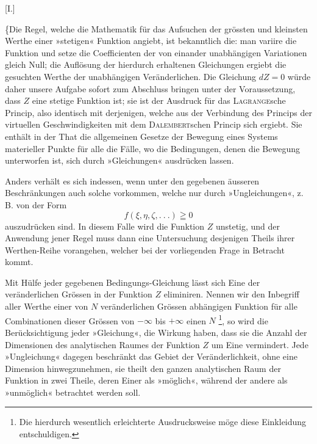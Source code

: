 \clearpage{}\NoSourceHead
{}
\begin{center}[I.]\end{center}
\indent \{Die Regel, welche die Mathematik für das Aufsuchen der grössten und kleinsten Werthe einer »stetigen« Funktion angiebt, ist bekanntlich die: man variire die Funktion und setze die Coefficienten der von einander unabhängigen Variationen gleich Null; die Auflösung der hierdurch erhaltenen Gleichungen ergiebt die gesuchten Werthe der unabhängigen Veränderlichen. Die Gleichung \(dZ=0\) würde daher unsere Aufgabe sofort zum Abschluss bringen unter der Voraussetzung, dass \(Z\) eine stetige Funktion ist; sie ist der Ausdruck für das \textsc{Lagrange}sche Princip, also identisch mit derjenigen, welche aus der Verbindung des Princips der virtuellen Geschwindigkeiten mit dem \textsc{Dalembert}schen Princip sich ergiebt. Sie enthält in der That die allgemeinen Gesetze der Bewegung eines Systems materieller Punkte für alle die Fälle, wo die Bedingungen, denen die Bewegung unterworfen ist, sich durch »Gleichungen« ausdrücken lassen.

\indent Anders verhält es sich indessen, wenn unter den gegebenen äusseren Beschränkungen auch solche vorkommen, welche nur durch »Ungleichungen«, z. B. von der Form
\[
f(\xi,\eta,\zeta,.\ .\ .)\geqq 0
\]
\noindent auszudrücken sind. In diesem Falle wird die Funktion \(Z\) unstetig, und der Anwendung jener Regel muss dann eine Untersuchung desjenigen Theils ihrer
\clearpage{}
\noindent Werthen-Reihe vorangehen, welcher bei der vorliegenden Frage in Betracht kommt.

\indent Mit Hülfe jeder gegebenen Bedingungs-Gleichung lässt sich Eine der veränderlichen Grössen in der Funktion \(Z\) eliminiren. Nennen wir den Inbegriff aller Werthe einer von \(N\) veränderlichen Grössen abhängigen Funktion für alle Combinationen dieser Grössen von \(-\infty\) bis \(+\infty\) einen  \(N\) \footnote{Die hierdurch wesentlich erleichterte Ausdrucksweise möge diese Einkleidung entschuldigen.}, so wird die Berücksichtigung jeder »Gleichung«, die Wirkung haben, dass sie die Anzahl der Dimensionen des analytischen Raumes der Funktion \(Z\) um Eine vermindert. Jede »Ungleichung« dagegen beschränkt das Gebiet der Veränderlichkeit, ohne eine Dimension hinwegzunehmen, sie theilt den ganzen analytischen Raum der Funktion in zwei Theile, deren Einer als »möglich«, während der andere als »unmöglich« betrachtet werden soll.

